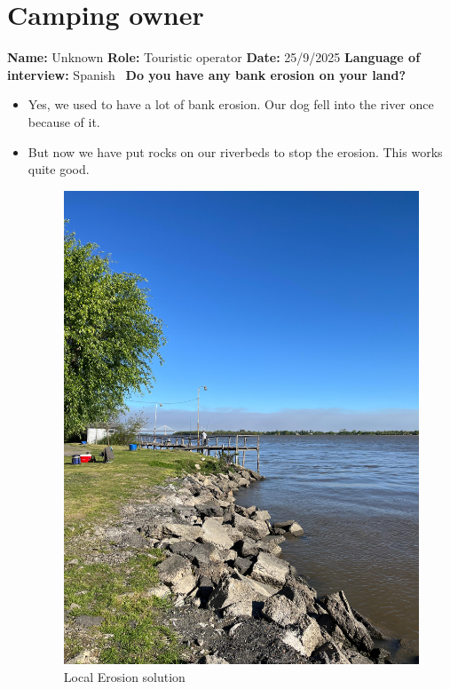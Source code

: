 \section{Camping owner}
\textbf{Name:} Unknown \newline
\textbf{Role:} Touristic operator \newline
\textbf{Date:} 25/9/2025 \newline
\textbf{Language of interview:} Spanish \newline \newline\
\textbf{Do you have any bank erosion on your land?}
\begin{itemize}
    \item Yes, we used to have a lot of bank erosion. Our dog fell into the river once because of it. 
    \item But now we have put rocks on our riverbeds to stop the erosion. This works quite good.

\begin{figure}[H]
    \centering
    \includegraphics[width=0.5\linewidth]{figures/appendixE/rocks.jpg}
    \caption{Local Erosion solution }
    \label{fig:placeholder}
\end{figure}

\end{itemize}